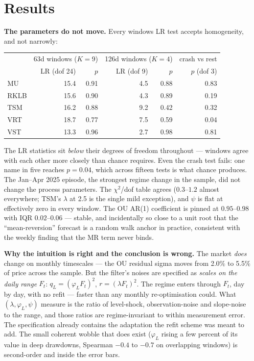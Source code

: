 \documentclass[11pt,a4paper]{article}
\begin{document}
\section*{Results}

\textbf{The parameters do not move.} Every windows LR test accepts homogeneity, and
not narrowly:

\begin{center}
\begin{tabular}{lrrrrr}
\toprule
 & \multicolumn{2}{c}{63d windows ($K=9$)} & \multicolumn{2}{c}{126d windows ($K=4$)} & crash vs rest \\
 & LR (dof 24) & $p$ & LR (dof 9) & $p$ & $p$ (dof 3) \\
\midrule
MU   & 15.4 & 0.91 & 4.5 & 0.88 & 0.83 \\
RKLB & 15.6 & 0.90 & 4.3 & 0.89 & 0.19 \\
TSM  & 16.2 & 0.88 & 9.2 & 0.42 & 0.32 \\
VRT  & 18.7 & 0.77 & 7.5 & 0.59 & 0.04 \\
VST  & 13.3 & 0.96 & 2.7 & 0.98 & 0.81 \\
\bottomrule
\end{tabular}
\end{center}

The LR statistics sit \emph{below} their degrees of freedom throughout --- windows agree
with each other more closely than chance requires. Even the crash test fails: one name
in five reaches $p=0.04$, which across fifteen tests is what chance produces. The
Jan--Apr 2025 episode, the strongest regime change in the sample, did not change the
process parameters. The $\chi^2$/dof table agrees ($0.3$--$1.2$ almost everywhere;
TSM's $\lambda$ at 2.5 is the single mild exception), and $\psi$ is flat at
effectively zero in every window. The OU AR(1) coefficient is pinned at $0.95$--$0.98$
with IQR $0.02$--$0.06$ --- stable, and incidentally so close to a unit root that the
``mean-reversion'' forecast is a random walk anchor in practice, consistent with the
weekly finding that the MR term never binds.

\textbf{Why the intuition is right and the conclusion is wrong.} The market
\emph{does} change on monthly timescales --- the OU residual sigma moves from 2.0\% to
5.5\% of price across the sample. But the filter's noises are specified as
\emph{scales on the daily range} $F_t$: $q_L = (\varphi_L F_t)^2$, $r = (\lambda
F_t)^2$. The regime enters through $F_t$, day by day, with no refit --- faster than any
monthly re-optimisation could. What $(\lambda, \varphi_L, \psi)$ measure is the ratio
of level-shock, observation-noise and slope-noise to the range, and those ratios are
regime-invariant to within measurement error. The specification already contains the
adaptation the refit scheme was meant to add. The small coherent wobble that does
exist ($\varphi_L$ rising a few percent of its value in deep drawdowns, Spearman
$-0.4$ to $-0.7$ on overlapping windows) is second-order and inside the error bars.
\end{document}

